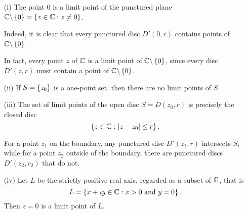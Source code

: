 \begin{example}
\begin{enumerate}
\item[(i)] The point $0$ is a limit point of the punctured plane $\mathbb{C} \backslash \left\{0\right\} = \left\{ z \in \mathbb{C} : z \neq 0 \right\}$.
\begin{center}
\end{center}
\begin{blankbox}
Indeed, it is clear that every punctured disc $D'(0,r)$ contains points of $\mathbb{C} \backslash \left\{0\right\}$.  
\end{blankbox}

In fact, every point $z$ of $\mathbb{C}$ is a limit point of $\mathbb{C} \backslash \left\{0\right\}$, since every disc $D'(z,r)$ must contain a point of $\mathbb{C} \backslash \left\{0\right\}$.


\item[(ii)] If $S= \left\{z_0\right\}$ is a one-point set, then there are no limit points of $S$.  %

\item[(iii)] The set of limit points of the open disc $S=D(z_0,r)$ is precisely the closed disc
\[
\left\{z \in \mathbb{C}: \left| z-z_0 \right| \leq r \right\}.
\]
\begin{center}
\end{center}
\begin{blankbox}
For a point $z_1$ on the boundary, any punctured disc $D'(z_1,r)$ intersects $S$, while for a point $z_2$ outside of the boundary, there are punctured discs $D'(z_2,r_2)$ that do not.
\end{blankbox}

\item[(iv)] Let $L$ be the strictly positive real axis, regarded as a subset of $\mathbb{C}$, that is
\[
L = \left\{ x+ iy \in \mathbb{C}: x>0 \text{ and } y=0 \right\}.
\]
Then $z=0$ is a limit point of $L$.
\begin{center}
\end{center}



\end{enumerate}
\end{example}


